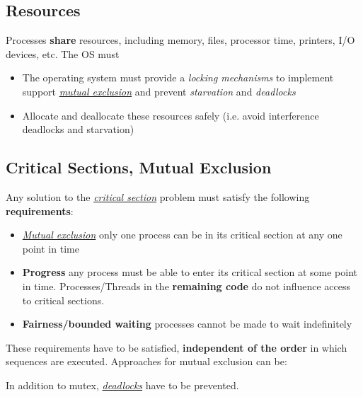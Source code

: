 \documentclass{article}
\newcommand{\inlinecode}[2]{\colorbox{lightgray}{\lstinline
[language=#1]$#2$}}
\newcommand{\worddef}[1]{\hyperref[sec:reference]{\textit{#1}}}
\begin{document}
\subsection{Resources}
\begin{flushleft}
Processes \textbf{share} resources, including memory, files, processor time, printers, I/O devices, etc. The OS must
\begin{itemize}
	\item The operating system must provide a \textit{locking mechanisms} to implement support \worddef{mutual exclusion} and prevent \textit{starvation} and \textit{deadlocks}
	\item Allocate and deallocate these resources safely (i.e. avoid interference deadlocks and starvation)
\end{itemize}
\end{flushleft}

\subsection{Critical Sections, Mutual Exclusion}
\begin{flushleft}
Any solution to the \worddef{critical section} problem must satisfy the following \textbf{requirements}:
\begin{itemize}
	\item \worddef{Mutual exclusion} only one process can be in its critical section at any one point in time
	\item \textbf{Progress} any process must be able to enter its critical section at some point in time. Processes/Threads in the \textbf{remaining code} do not influence access to critical sections.
	\item \textbf{Fairness/bounded waiting} processes cannot be made to wait indefinitely
\end{itemize}
These requirements have to be satisfied, \textbf{independent of the order} in which sequences are executed.
\smallskip
Approaches for mutual exclusion can be:
In addition to mutex, \worddef{deadlocks} have to be prevented.
\end{flushleft}
\end{document}
